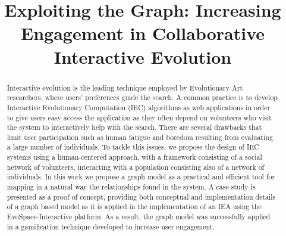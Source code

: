 \documentclass[conference]{IEEEtran}
\begin{document}

\title{Exploiting the Graph: Increasing Engagement in Collaborative Interactive Evolution}



\author{
\and
{}
\and
{}
}

\maketitle

\begin{abstract}
Interactive evolution is the leading technique employed by 
Evolutionary Art researchers, where users' preferences guide the search. A common
practice is to develop Interactive Evolutionary Computation (IEC) algorithms
as web applications in order to give users easy access the application as they
often depend on volunteers who visit the system to interactively help with the search. 
There are several drawbacks that limit user participation 
such as human fatigue and boredom resulting from evaluating 
a large number of individuals. 
To tackle this issues, we propose the design of IEC systems using a human-centered 
approach, with a framework consisting of a social network of 
volunteers, interacting with a population consisting also of a network 
of individuals. In this work we propose a graph model as a practical 
and efficient tool for mapping in a natural way the relationships 
found in the system. A case study is presented as a proof of concept, 
providing both conceptual and implementation details of a graph based model 
as it is  applied in the implementation of an IEA using the EvoSpace-Interactive platform. 
As a result, the graph model was successfully applied in a gamification technique 
developed to increase user engagement. 




\end{abstract}
\end{document}
